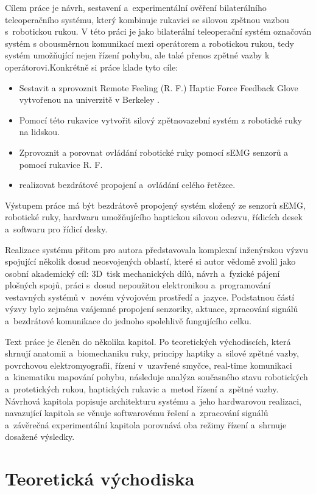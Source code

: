 \documentclass[FZS,DP]{tulthesis}
\begin{document}
Cílem práce je návrh, sestavení a~experimentální ověření bilaterálního teleoperačního systému, který kombinuje rukavici se silovou zpětnou vazbou s~robotickou rukou. V této práci je jako bilaterální teleoperační systém označován systém s obousměrnou komunikací mezi operátorem a robotickou rukou, tedy systém umožňující nejen řízení pohybu, ale také přenos zpětné vazby k operátorovi.Konkrétně si práce klade tyto cíle:
%
\begin{itemize}
    \item Sestavit a zprovoznit Remote Feeling (R. F.) Haptic Force Feedback Glove vytvořenou na univerzitě v Berkeley \cite{Curtis2021}.
   
    \item Pomocí této rukavice vytvořit silový zpětnovazební systém z robotické ruky na lidskou.
    \item Zprovoznit a porovnat ovládání robotické ruky pomocí sEMG senzorů a pomocí rukavice R. F.
    \item realizovat bezdrátové propojení a~ovládání celého řetězce.
\end{itemize}
%
Výstupem práce má být bezdrátově propojený systém složený ze senzorů sEMG, robotické ruky, hardwaru umožňujícího haptickou silovou odezvu, řídicích desek a~softwaru pro řídicí desky.

Realizace systému přitom pro autora představovala komplexní inženýrskou výzvu spojující několik dosud neosvojených oblastí, které si autor vědomě zvolil jako osobní akademický cíl: 3D~tisk mechanických dílů, návrh a~fyzické pájení plošných spojů, práci s~dosud nepoužitou elektronikou a~programování vestavných systémů v~novém vývojovém prostředí a~jazyce. Podstatnou částí výzvy bylo
zejména vzájemné propojení senzoriky, aktuace, zpracování signálů a~bezdrátové komunikace do jednoho spolehlivě fungujícího celku.

Text práce je členěn do několika kapitol. Po teoretických východiscích, která shrnují anatomii a~biomechaniku ruky, principy haptiky a~silové zpětné vazby, povrchovou elektromyografii, řízení v~uzavřené smyčce, real-time komunikaci
a~kinematiku mapování pohybu, následuje analýza současného stavu robotických a~protetických rukou, haptických rukavic a~metod řízení a~zpětné vazby. Návrhová kapitola popisuje architekturu systému a~jeho hardwarovou realizaci, navazující kapitola se věnuje softwarovému řešení a~zpracování signálů a~závěrečná experimentální kapitola porovnává oba režimy řízení a~shrnuje
dosažené výsledky.

\chapter{Teoretická východiska}
\end{document}
